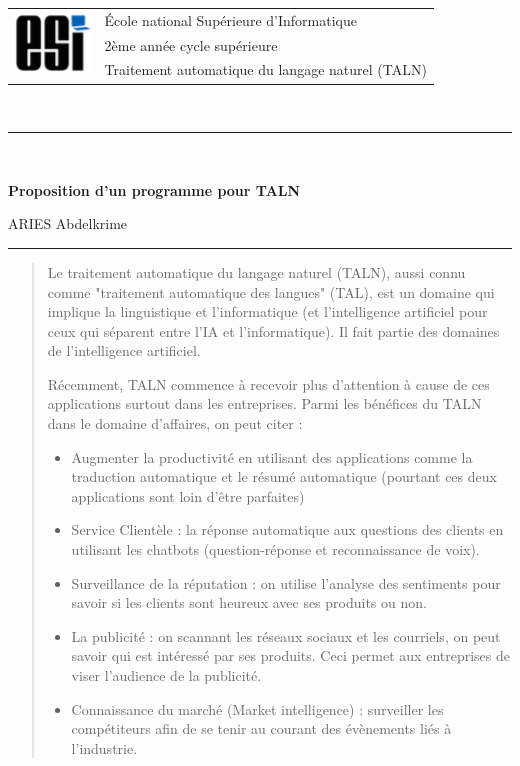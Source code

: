 \documentclass[11pt, a4paper]{article}
\begin{document}
\pagestyle{fancy}

\noindent
\begin{tabular}{ll}
\multirow{3}{*}{\includegraphics[width=2cm]{esi-logo.png}} & \'Ecole national Supérieure d'Informatique\\
& 2ème année cycle supérieure\\
& Traitement automatique du langage naturel (TALN)
\end{tabular}\\[.25cm]
\noindent\rule{\textwidth}{1pt}\\%
\begin{center}
{\LARGE \textbf{Proposition d'un programme pour TALN}}
\begin{flushright}
	ARIES Abdelkrime
\end{flushright}
\end{center}
\noindent\rule{\textwidth}{1pt}

\begin{abstract}
	Le traitement automatique du langage naturel (TALN), aussi connu comme "traitement automatique des langues" (TAL), est un domaine qui implique la linguistique et l'informatique (et l'intelligence artificiel pour ceux qui séparent entre l'IA et l'informatique). Il fait partie des domaines de l'intelligence artificiel.
	
	Récemment, TALN commence à recevoir plus d'attention à cause de ces applications surtout dans les entreprises. Parmi les bénéfices du TALN dans le domaine d'affaires, on peut citer : 
	\begin{itemize}
		\item Augmenter la productivité en utilisant des applications comme la traduction automatique et le résumé automatique (pourtant ces deux applications sont loin d'être parfaites)
		\item Service Clientèle : la réponse automatique aux questions des clients en utilisant les chatbots (question-réponse et reconnaissance de voix). 
		\item Surveillance de la réputation : on utilise l'analyse des sentiments pour savoir si les clients sont heureux avec ses produits ou non. 
		\item La publicité : on scannant les réseaux sociaux et les courriels, on peut savoir qui est intéressé par ses produits. Ceci permet aux entreprises de viser l'audience de la publicité. 
		\item Connaissance du marché (Market intelligence) : surveiller les compétiteurs afin de se tenir au courant des évènements liés à l'industrie.
		
	\end{itemize}
\end{abstract}
\end{document}
